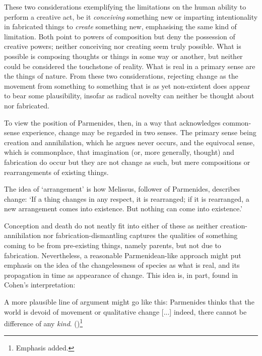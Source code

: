 These two considerations exemplifying the limitations on the human ability to perform a creative act, be it \emph{conceiving} something new or imparting intentionality in fabricated things to \emph{create} something new, emphasising the same kind of limitation. Both point to powers of composition but deny the possession of creative powers; neither conceiving nor creating seem truly possible. What is possible is composing thoughts or things in some way or another, but neither could be considered the touchstone of reality. What is real in a primary sense are the things of nature. From these two considerations, rejecting change as the movement from something to something that is as yet non-existent does appear to bear some plausibility, insofar as radical novelty can neither be thought about nor fabricated.

To view the position of Parmenides, then, in a way that acknowledges common-sense experience, change may be regarded in two senses. The primary sense being creation and annihilation, which he argues never occurs, and the equivocal sense, which is commonplace, that imagination (or, more generally, thought) and fabrication do occur but they are not change as such, but mere compositions or rearrangements of existing things.
\begin{quoting}
The idea of `arrangement' is how Melissus, follower of Parmenides, describes change: `If a thing changes in any respect, it is rearranged; if it is rearranged, a new arrangement comes into existence. But nothing can come into existence.' \parencite[][]{cohen-parm1}
\end{quoting}
Conception and death do not neatly fit into either of these as neither creation-annihilation nor fabrication-dismantling captures the qualities of something coming to be from pre-existing things, namely parents, but not due to fabrication. Nevertheless, a reasonable Parmenidean-like approach might put emphasis on the idea of the changelessness of species as what is real, and its propagation in time as appearance of change. This idea is, in part, found in Cohen's interpretation:
\begin{quoting}
A more plausible line of argument might go like this: Parmenides thinks that the world is devoid of movement or qualitative change [...] indeed, there cannot be difference of any \emph{kind}. (\citeyear[][]{cohen-parm1})\footnote{Emphasis added.}
\end{quoting}


